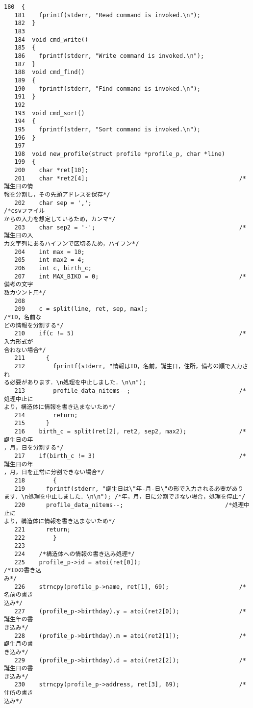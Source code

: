 \begin{Verbatim}[fontsize=\small, baselinestretch=0.8]
   180	{
   181	  fprintf(stderr, "Read command is invoked.\n");
   182	}
   183	
   184	void cmd_write()
   185	{
   186	  fprintf(stderr, "Write command is invoked.\n");
   187	}
   188	void cmd_find()
   189	{
   190	  fprintf(stderr, "Find command is invoked.\n");
   191	}
   192	
   193	void cmd_sort()
   194	{
   195	  fprintf(stderr, "Sort command is invoked.\n");
   196	}
   197	
   198	void new_profile(struct profile *profile_p, char *line)
   199	{
   200	  char *ret[10];
   201	  char *ret2[4];                                           /*誕生日の情
報を分割し，その先頭アドレスを保存*/
   202	  char sep = ',';                                          /*csvファイル
からの入力を想定しているため，カンマ*/
   203	  char sep2 = '-';                                         /*誕生日の入
力文字列にあるハイフンで区切るため，ハイフン*/
   204	  int max = 10;
   205	  int max2 = 4;
   206	  int c, birth_c;
   207	  int MAX_BIKO = 0;                                        /*備考の文字
数カウント用*/
   208	  
   209	  c = split(line, ret, sep, max);                          /*ID，名前な
どの情報を分割する*/
   210	  if(c != 5)                                               /*入力形式が
合わない場合*/
   211	    {
   212	      fprintf(stderr, "情報はID，名前，誕生日，住所，備考の順で入力され
る必要があります．\n処理を中止しました．\n\n");
   213	      profile_data_nitems--;                               /*処理中止に
より，構造体に情報を書き込まないため*/
   214	      return;
   215	    }
   216	  birth_c = split(ret[2], ret2, sep2, max2);               /*誕生日の年
，月，日を分割する*/
   217	  if(birth_c != 3)                                         /*誕生日の年
，月，日を正常に分割できない場合*/
   218	      {
   219		fprintf(stderr, "誕生日は\"年-月-日\"の形で入力される必要があり
ます．\n処理を中止しました．\n\n"); /*年，月，日に分割できない場合，処理を停止*/
   220		profile_data_nitems--;                             /*処理中止に
より，構造体に情報を書き込まないため*/
   221		return;
   222	      }
   223	
   224	  /*構造体への情報の書き込み処理*/
   225	  profile_p->id = atoi(ret[0]);                            /*IDの書き込
み*/
   226	  strncpy(profile_p->name, ret[1], 69);                    /*名前の書き
込み*/
   227	  (profile_p->birthday).y = atoi(ret2[0]);                 /*誕生年の書
き込み*/
   228	  (profile_p->birthday).m = atoi(ret2[1]);                 /*誕生月の書
き込み*/
   229	  (profile_p->birthday).d = atoi(ret2[2]);                 /*誕生日の書
き込み*/
   230	  strncpy(profile_p->address, ret[3], 69);                 /*住所の書き
込み*/

\end{Verbatim}
